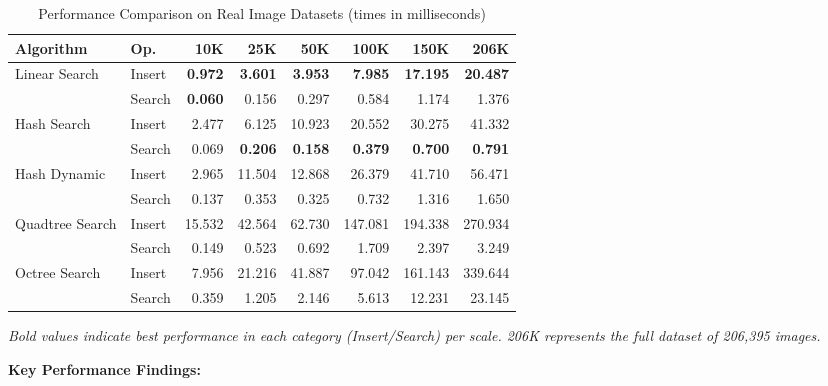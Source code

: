 \documentclass{sbc2023}
\begin{document}
\begin{table}[H]
    \footnotesize 
    \centering
    \caption{Performance Comparison on Real Image Datasets (times in milliseconds)} 
    \label{tab:real_performance_ms}
    \setlength{\tabcolsep}{2pt} 
    \begin{tabular}{ll rrrrrr} 
        \toprule
        \textbf{Algorithm} & \textbf{Op.} & \textbf{10K} & \textbf{25K} & \textbf{50K} & \textbf{100K} & \textbf{150K} & \textbf{206K} \\
        \midrule
        \multirow{2}{*}{Linear Search} & Insert & \textbf{0.972} & \textbf{3.601} & \textbf{3.953} & \textbf{7.985} & \textbf{17.195} & \textbf{20.487} \\
        & Search & \textbf{0.060} & 0.156 & 0.297 & 0.584 & 1.174 & 1.376 \\
        \cmidrule(lr){2-8}
        \multirow{2}{*}{Hash Search} & Insert & 2.477 & 6.125 & 10.923 & 20.552 & 30.275 & 41.332 \\
        & Search & 0.069 & \textbf{0.206} & \textbf{0.158} & \textbf{0.379} & \textbf{0.700} & \textbf{0.791} \\
        \cmidrule(lr){2-8}
        \multirow{2}{*}{Hash Dynamic} & Insert & 2.965 & 11.504 & 12.868 & 26.379 & 41.710 & 56.471 \\
        & Search & 0.137 & 0.353 & 0.325 & 0.732 & 1.316 & 1.650 \\
        \cmidrule(lr){2-8}
        \multirow{2}{*}{Quadtree Search} & Insert & 15.532 & 42.564 & 62.730 & 147.081 & 194.338 & 270.934 \\
        & Search & 0.149 & 0.523 & 0.692 & 1.709 & 2.397 & 3.249 \\
        \cmidrule(lr){2-8}
        \multirow{2}{*}{Octree Search} & Insert & 7.956 & 21.216 & 41.887 & 97.042 & 161.143 & 339.644 \\
        & Search & 0.359 & 1.205 & 2.146 & 5.613 & 12.231 & 23.145 \\
        \bottomrule
    \end{tabular}
    \vspace{0.2cm}
    \begin{minipage}{\columnwidth}
    \footnotesize
    \textit{Bold values indicate best performance in each category (Insert/Search) per scale. 206K represents the full dataset of 206,395 images.}
    \end{minipage}
\end{table}

\textbf{Key Performance Findings:}
\end{document}
